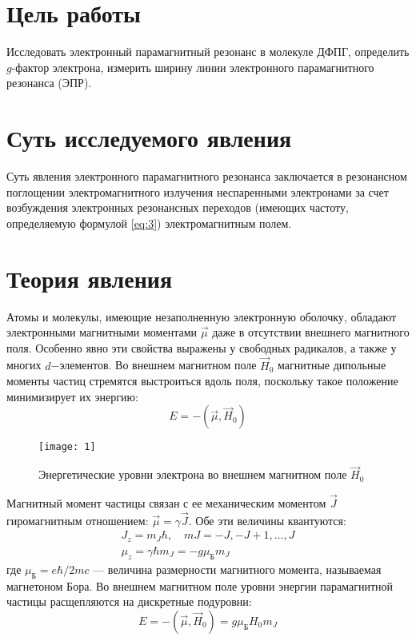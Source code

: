 \documentclass[a4paper, 12pt]{article}
\begin{document}


\section{Цель работы}
Исследовать электронный парамагнитный резонанс в молекуле ДФПГ, определить $g$-фактор
электрона, измерить ширину линии электронного парамагнитного резонанса
(ЭПР).


\section{Суть исследуемого явления}
Суть явления электронного парамагнитного резонанса заключается в
резонансном поглощении электромагнитного излучения неспаренными
электронами за счет возбуждения электронных резонансных переходов
(имеющих частоту, определяемую формулой \eqref{eq:3})
электромагнитным полем.



\section{Теория явления}
Атомы и молекулы, имеющие незаполненную электронную оболочку, обладают
электронными магнитными моментами $\vec{\mu}$ даже в отсутствии
внешнего магнитного поля. Особенно явно эти свойства выражены у
свободных радикалов, а также у многих $d$−элементов. Во внешнем
магнитном поле $\vec{H}_{0}$ магнитные дипольные моменты частиц
стремятся выстроиться вдоль поля, поскольку такое положение
минимизирует их энергию:
\begin{equation}
    E = -(\vec{\mu}, \vec{H}_{0})
    \label{eq:1}
\end{equation}

\begin{wrapfigure}{r}{0.46\linewidth}
    \texttt{[image: 1]}
    \caption{Энергетические уровни электрона во внешнем магнитном
    поле $\vec{H}_{0}$}
    \label{fig:1}
\end{wrapfigure}

Магнитный момент частицы связан с ее механическим моментом $\vec{J}$
гиромагнитным отношением: $\vec{\mu}=\gamma \vec{J}$. Обе эти величины
квантуются:
\begin{equation*}
    \begin{gathered}
        J_z = m_J \hbar, \hspace{1em} mJ = -J, -J+1, \ldots, J\\
        \mu_z = \gamma \hbar m_J = -g \mu_\text{Б} m_J
    \end{gathered}
\end{equation*}
где $\mu_\text{Б} = e \hbar / 2mc$ --- величина размерности магнитного
момента, называемая магнетоном Бора. Во внешнем магнитном поле уровни
энергии парамагнитной частицы расщепляются на дискретные подуровни:
\begin{equation}
    E = - (\vec{\mu}, \vec{H}_{0}) = g \mu_\text{Б} H_0 m_J
    \label{eq:2}
\end{equation}
\end{document}

